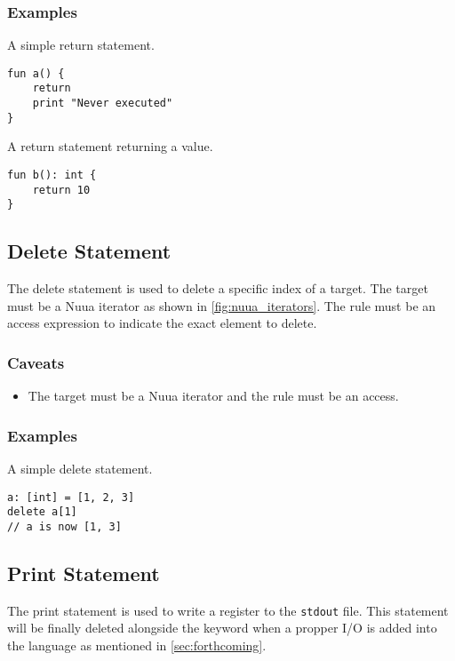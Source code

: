 \subsubsection{Examples}

A simple return statement.
\begin{lstlisting}
fun a() {
    return
    print "Never executed"
}
\end{lstlisting}
A return statement returning a value.
\begin{lstlisting}
fun b(): int {
    return 10
}
\end{lstlisting}

\subsection{Delete Statement}
\label{sec:delete_statement}

The delete statement is used to delete a specific index of a target. The target must be a Nuua iterator as shown in \autoref{fig:nuua_iterators}.
The rule must be an access expression to indicate the exact element to delete.

\subsubsection{Caveats}

\begin{itemize}
    \item The target must be a Nuua iterator and the rule must be an access.
\end{itemize}

\subsubsection{Examples}

A simple delete statement.
\begin{lstlisting}
a: [int] = [1, 2, 3]
delete a[1]
// a is now [1, 3]
\end{lstlisting}

\subsection{Print Statement}
\label{sec:print_statement}

The print statement is used to write a register to the \texttt{stdout} file.
This statement will be finally deleted alongside the keyword when a propper I/O is added into the language as mentioned in \autoref{sec:forthcoming}.

